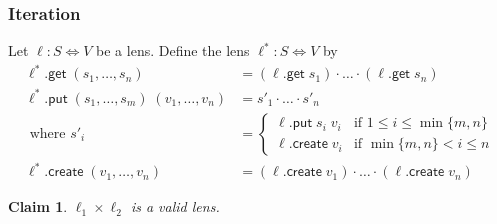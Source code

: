 \documentclass[acmsmall,review,anonymous]{acmart}\settopmatter{printfolios=true,printccs=false,printacmref=false}
\newtheorem{claim}{Claim}
\newcommand{\kw}[1]{\ensuremath{\mathsf{#1}}}
\newcommand{\get}{\ensuremath{\kw{get}}}
\newcommand{\pput}{\ensuremath{\kw{put}}}
\newcommand{\create}{\ensuremath{\kw{create}}}
\begin{document}
\subsubsection{Iteration}
Let $\ell: S \Leftrightarrow V$ be a lens. Define the lens $\ell^*: S
\Leftrightarrow V$ by
\begin{align*}
\ell^* .\get \; (s_1, \ldots, s_n) &= (\ell.\get \; s_1) \cdot \ldots \cdot
(\ell.\get \; s_n)\\
\ell^* .\pput \; (s_1, \ldots, s_m) \; (v_1, \ldots, v_n) &= s'_1 \cdot \ldots
\cdot s'_n\\
\text{ where } s'_i &= \begin{cases}
\ell.\pput \; s_i \; v_i & \text{if } 1 \leq i \leq \min\{m, n\}\\
\ell.\create \; v_i & \text{if } \min\{m, n\} < i \leq n
\end{cases}\\
\ell^*.\create \; (v_1, \ldots, v_n) &= (\ell.\create \; v_1) \cdot \ldots \cdot
(\ell.\create \; v_n)
\end{align*}
\begin{claim}
$\ell_1 \times \ell_2$ is a valid lens.
\end{claim}
\end{document}
